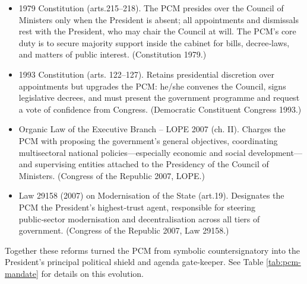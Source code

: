 \documentclass[a4paper, 12pt]{article}
\begin{document}
\begin{itemize}
\item 1979 Constitution (arts.215–218). The PCM presides over the Council of Ministers only when the President is absent; all appointments and dismissals rest with the President, who may chair the Council at will.  The PCM’s core duty is to secure majority support inside the cabinet for bills, decree‑laws, and matters of public interest. (Constitution 1979.)

\item 1993 Constitution (arts. 122–127). Retains presidential discretion over appointments but upgrades the PCM: he/she convenes the Council, signs legislative decrees, and must present the government programme and request a vote of confidence from Congress. (Democratic Constituent Congress 1993.)
\item Organic Law of the Executive Branch – LOPE 2007 (ch. II). Charges the PCM with proposing the government’s general objectives, coordinating multisectoral national policies—especially economic and social development—and supervising entities attached to the Presidency of the Council of Ministers. (Congress of the Republic 2007, LOPE.)
\item Law 29158 (2007) on Modernisation of the State (art.19). Designates the PCM the President’s highest‑trust agent, responsible for steering public‑sector modernisation and decentralisation across all tiers of government.  (Congress of the Republic 2007, Law 29158.)
\end{itemize}

Together these reforms turned the PCM from symbolic countersignatory into the President’s principal political shield and agenda gate‑keeper. See Table \ref{tab:pcm-mandate} for details on this evolution.
\end{document}
